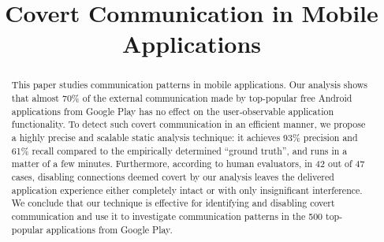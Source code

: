 \documentclass[conference]{IEEEtran}
\begin{document}

\title{Covert Communication in Mobile Applications}

\author{
}



\maketitle
\begin{abstract}
This paper studies communication patterns in mobile applications. Our analysis
shows that almost 70\% of the external communication made by top-popular free
Android applications from Google Play has no effect on the user-observable
application functionality. To detect such covert communication in an efficient
manner, we propose a highly precise and scalable static analysis technique: 
it achieves 93\% precision and 61\% recall compared to the empirically determined ``ground truth'', 
and runs in a matter of a few minutes.
Furthermore, according to human evaluators, in 42 out of 47 cases, disabling connections deemed covert by our analysis leaves the delivered application experience either completely intact or with only insignificant interference. 
We conclude that our technique is effective for identifying and disabling covert communication and use it to investigate communication patterns in the 500 top-popular applications from Google Play. 
\end{abstract}
\end{document}
